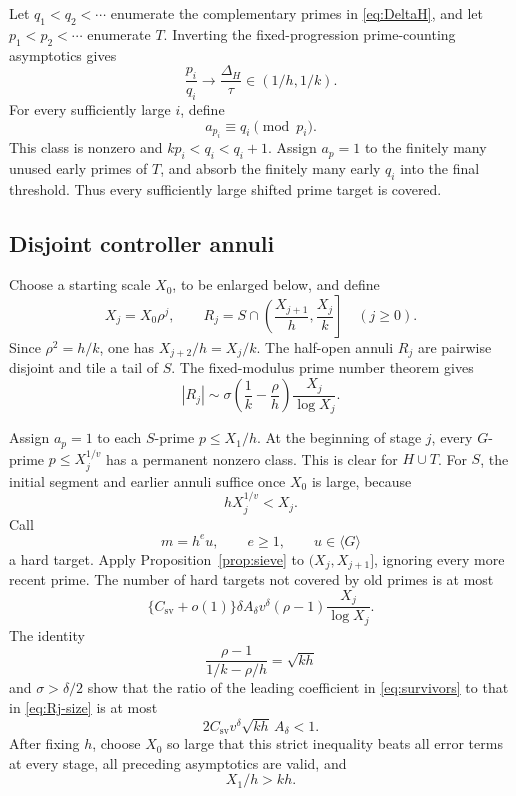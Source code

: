 \documentclass[10pt]{amsart}
\numberwithin{equation}{section}
\newcommand{\Gsem}{\langle G\rangle}
\theoremstyle{remark}
\begin{document}
Let \(q_1<q_2<\cdots\) enumerate the complementary primes in
\eqref{eq:DeltaH}, and let \(p_1<p_2<\cdots\) enumerate \(T\). Inverting
the fixed-progression prime-counting asymptotics gives
\begin{equation}\label{eq:piqi}
 \frac{p_i}{q_i}\longrightarrow\frac{\Delta_H}{\tau}
 \in(1/h,1/k).
\end{equation}
For every sufficiently large \(i\), define
\begin{equation}\label{eq:prime-target-class}
 a_{p_i}\equiv q_i\pmod{p_i}.
\end{equation}
This class is nonzero and \(kp_i<q_i<q_i+1\). Assign \(a_p=1\) to the
finitely many unused early primes of \(T\), and absorb the finitely many
early \(q_i\) into the final threshold. Thus every sufficiently large shifted
prime target is covered.

\subsection{Disjoint controller annuli}

Choose a starting scale \(X_0\), to be enlarged below, and define
\begin{equation}\label{eq:annuli}
 X_j=X_0\rho^j,\qquad
 R_j=S\cap\left(\frac{X_{j+1}}h,\frac{X_j}k\right]
 \quad(j\ge0).
\end{equation}
Since \(\rho^2=h/k\), one has \(X_{j+2}/h=X_j/k\). The half-open annuli
\(R_j\) are pairwise disjoint and tile a tail of \(S\). The fixed-modulus
prime number theorem gives
\begin{equation}\label{eq:Rj-size}
 |R_j|\sim
 \sigma\left(\frac1k-\frac\rho h\right)\frac{X_j}{\log X_j}.
\end{equation}

Assign \(a_p=1\) to each \(S\)-prime \(p\le X_1/h\). At the beginning of
stage \(j\), every \(G\)-prime \(p\le X_j^{1/v}\) has a permanent nonzero
class. This is clear for \(H\cup T\). For \(S\), the initial segment and
earlier annuli suffice once \(X_0\) is large, because
\[
 hX_j^{1/v}<X_j.
\]
Call
\begin{equation}\label{eq:hard-target}
 m=h^eu,\qquad e\ge1,\qquad u\in\Gsem
\end{equation}
a hard target. Apply Proposition~\ref{prop:sieve} to
\((X_j,X_{j+1}]\), ignoring every more recent prime. The number of hard
targets not covered by old primes is at most
\begin{equation}\label{eq:survivors}
 \{C_{\mathrm{sv}}+o(1)\}
 \delta A_\delta v^\delta(\rho-1)\frac{X_j}{\log X_j}.
\end{equation}
The identity
\begin{equation}\label{eq:ratio-identity}
 \frac{\rho-1}{1/k-\rho/h}=\sqrt{kh}
\end{equation}
and \(\sigma>\delta/2\) show that the ratio of the leading coefficient in
\eqref{eq:survivors} to that in \eqref{eq:Rj-size} is at most
\[
 2C_{\mathrm{sv}}v^\delta\sqrt{kh}\,A_\delta<1.
\]
After fixing \(h\), choose \(X_0\) so large that this strict inequality beats
all error terms at every stage, all preceding asymptotics are valid, and
\begin{equation}\label{eq:X0-choice}
 X_1/h>kh.
\end{equation}
\end{document}
